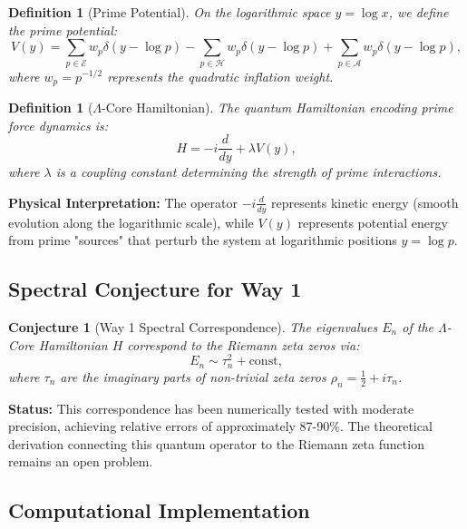 \documentclass[12pt]{article}
\newtheorem{definition}[theorem]{Definition}
\newtheorem{conjecture}[theorem]{Conjecture}
\begin{document}
\begin{definition}[Prime Potential]
On the logarithmic space $y = \log x$, we define the prime potential:
\begin{equation}
V(y) = \sum_{p \in \mathcal{E}} w_p \delta(y - \log p) - \sum_{p \in \mathcal{H}} w_p \delta(y - \log p) + \sum_{p \in \mathcal{A}} w_p \delta(y - \log p),
\end{equation}
where $w_p = p^{-1/2}$ represents the \textit{quadratic inflation weight}.
\end{definition}

\begin{definition}[$\Lambda$-Core Hamiltonian]
The quantum Hamiltonian encoding prime force dynamics is:
\begin{equation}
H = -i\frac{d}{dy} + \lambda V(y),
\end{equation}
where $\lambda$ is a coupling constant determining the strength of prime interactions.
\end{definition}

\textbf{Physical Interpretation:} The operator $-i\frac{d}{dy}$ represents kinetic energy (smooth evolution along the logarithmic scale), while $V(y)$ represents potential energy from prime "sources" that perturb the system at logarithmic positions $y = \log p$.

\subsection{Spectral Conjecture for Way 1}

\begin{conjecture}[Way 1 Spectral Correspondence]
The eigenvalues $E_n$ of the $\Lambda$-Core Hamiltonian $H$ correspond to the Riemann zeta zeros via:
\begin{equation}
E_n \sim \tau_n^2 + \text{const},
\end{equation}
where $\tau_n$ are the imaginary parts of non-trivial zeta zeros $\rho_n = \frac{1}{2} + i\tau_n$.
\end{conjecture}

\textbf{Status:} This correspondence has been numerically tested with moderate precision, achieving relative errors of approximately 87-90\%. The theoretical derivation connecting this quantum operator to the Riemann zeta function remains an open problem.

\subsection{Computational Implementation}
\end{document}
